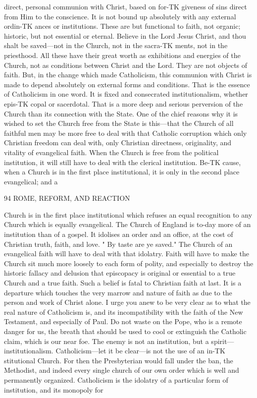 \documentclass[12pt,a5paper,twoside]{book}
\begin{document}
direct, personal communion with Christ, based on for-TK
giveness of sins direct from Him to the conscience. 
It is not bound up absolutely with any external ordin-TK
ances or institutions. These are but functional to 
faith, not organic; historic, but not essential or 
eternal. Believe in the Lord Jesus Christ, and thou 
shalt be saved---not in the Church, not in the sacra-TK
ments, not in the priesthood. All these have their 
great worth as exhibitions and energies of the Church, 
not as conditions between Christ and the Lord. They 
are not objects of faith. But, in the change which 
made Catholicism, this communion with Christ is made 
to depend absolutely on external forms and conditions. 
That is the essence of Catholicism in one word. It 
is fixed and consecrated institutionalism, whether epis-TK
copal or sacerdotal. That is a more deep and serious 
perversion of the Church than its connection with the 
State. One of the chief reasons why it is wished to 
set the Church free from the State is this---that the 
Church of all faithful men may be more free to deal 
with that Catholic corruption which only Christian 
freedom can deal with, only Christian directness, 
originality, and vitality of evangelical faith. When 
the Church is free from the political institution, it will 
still have to deal with the clerical institution. Be-TK
cause, when a Church is in the first place institutional, 
it is only in the second place evangelical; and a 



94 ROME, REFORM, AND REACTION 

Church is in the first place institutional which refuses 
an equal recognition to any Church which is equally 
evangelical. The Church of England is to-day more 
of an institution than of a gospel. It idolises an order 
and an office, at the cost of Christian truth, faith, and 
love. " By taste are ye saved." The Church of an 
evangelical faith will have to deal with that idolatry. 
Faith will have to make the Church sit much more 
loosely to each form of polity, and especially to destroy 
the historic fallacy and delusion that episcopacy is original 
or essential to a true Church and a true faith. Such a 
belief is fatal to Christian faith at last. It is a departure 
which touches the very marrow and nature of faith as 
due to the person and work of Christ alone. I urge 
you anew to be very clear as to what the real nature of 
Catholicism is, and its incompatibility with the faith of 
the New Testament, and especially of Paul. Do not 
waste on the Pope, who is a remote danger for us, the 
breath that should be used to cool or extinguish the 
Catholic claim, which is our near foe. The enemy is 
not an institution, but a spirit---institutionalism. 
Catholicism---let it be clear---is not the use of an in-TK
stitutional Church. For then the Presbyterian would 
fall under the ban, the Methodist, and indeed every 
single church of our own order which is well and 
permanently organized. Catholicism is the idolatry of 
a particular form of institution, and its monopoly for 
\end{document}
